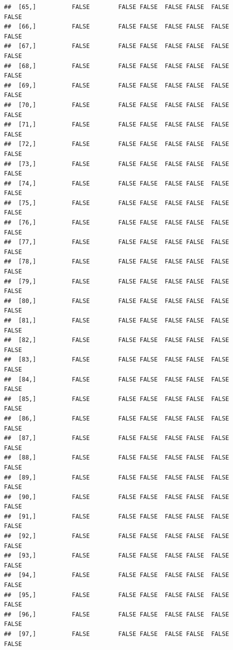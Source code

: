 \documentclass[
  english,
  man,floatsintext]{apa6}
\begin{document}
\begin{verbatim}
##  [65,]          FALSE        FALSE FALSE  FALSE FALSE  FALSE            FALSE
##  [66,]          FALSE        FALSE FALSE  FALSE FALSE  FALSE            FALSE
##  [67,]          FALSE        FALSE FALSE  FALSE FALSE  FALSE            FALSE
##  [68,]          FALSE        FALSE FALSE  FALSE FALSE  FALSE            FALSE
##  [69,]          FALSE        FALSE FALSE  FALSE FALSE  FALSE            FALSE
##  [70,]          FALSE        FALSE FALSE  FALSE FALSE  FALSE            FALSE
##  [71,]          FALSE        FALSE FALSE  FALSE FALSE  FALSE            FALSE
##  [72,]          FALSE        FALSE FALSE  FALSE FALSE  FALSE            FALSE
##  [73,]          FALSE        FALSE FALSE  FALSE FALSE  FALSE            FALSE
##  [74,]          FALSE        FALSE FALSE  FALSE FALSE  FALSE            FALSE
##  [75,]          FALSE        FALSE FALSE  FALSE FALSE  FALSE            FALSE
##  [76,]          FALSE        FALSE FALSE  FALSE FALSE  FALSE            FALSE
##  [77,]          FALSE        FALSE FALSE  FALSE FALSE  FALSE            FALSE
##  [78,]          FALSE        FALSE FALSE  FALSE FALSE  FALSE            FALSE
##  [79,]          FALSE        FALSE FALSE  FALSE FALSE  FALSE            FALSE
##  [80,]          FALSE        FALSE FALSE  FALSE FALSE  FALSE            FALSE
##  [81,]          FALSE        FALSE FALSE  FALSE FALSE  FALSE            FALSE
##  [82,]          FALSE        FALSE FALSE  FALSE FALSE  FALSE            FALSE
##  [83,]          FALSE        FALSE FALSE  FALSE FALSE  FALSE            FALSE
##  [84,]          FALSE        FALSE FALSE  FALSE FALSE  FALSE            FALSE
##  [85,]          FALSE        FALSE FALSE  FALSE FALSE  FALSE            FALSE
##  [86,]          FALSE        FALSE FALSE  FALSE FALSE  FALSE            FALSE
##  [87,]          FALSE        FALSE FALSE  FALSE FALSE  FALSE            FALSE
##  [88,]          FALSE        FALSE FALSE  FALSE FALSE  FALSE            FALSE
##  [89,]          FALSE        FALSE FALSE  FALSE FALSE  FALSE            FALSE
##  [90,]          FALSE        FALSE FALSE  FALSE FALSE  FALSE            FALSE
##  [91,]          FALSE        FALSE FALSE  FALSE FALSE  FALSE            FALSE
##  [92,]          FALSE        FALSE FALSE  FALSE FALSE  FALSE            FALSE
##  [93,]          FALSE        FALSE FALSE  FALSE FALSE  FALSE            FALSE
##  [94,]          FALSE        FALSE FALSE  FALSE FALSE  FALSE            FALSE
##  [95,]          FALSE        FALSE FALSE  FALSE FALSE  FALSE            FALSE
##  [96,]          FALSE        FALSE FALSE  FALSE FALSE  FALSE            FALSE
##  [97,]          FALSE        FALSE FALSE  FALSE FALSE  FALSE            FALSE

\end{verbatim}
\end{document}

